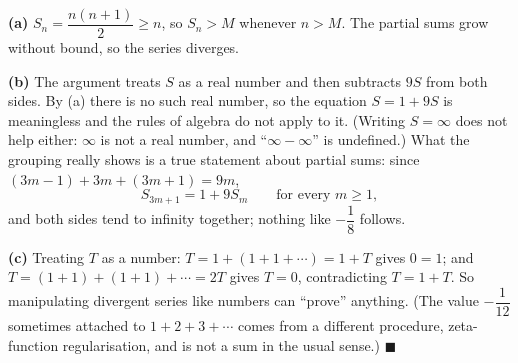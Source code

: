 \textbf{(a)} $S_n=\dfrac{n(n+1)}2\ge n$, so $S_n>M$ whenever $n>M$. The partial sums grow without bound, so the series diverges.

\textbf{(b)} The argument treats $S$ as a real number and then subtracts $9S$ from both sides. By (a) there is no such real number, so the equation $S=1+9S$ is meaningless and the rules of algebra do not apply to it. (Writing $S=\infty$ does not help either: $\infty$ is not a real number, and ``$\infty-\infty$'' is undefined.) What the grouping really shows is a true statement about partial sums: since $(3m-1)+3m+(3m+1)=9m$,
\[S_{3m+1}=1+9S_m\qquad\text{for every }m\ge1,\]
and both sides tend to infinity together; nothing like $-\dfrac18$ follows.

\textbf{(c)} Treating $T$ as a number: $T=1+(1+1+\cdots)=1+T$ gives $0=1$; and $T=(1+1)+(1+1)+\cdots=2T$ gives $T=0$, contradicting $T=1+T$. So manipulating divergent series like numbers can ``prove'' anything. (The value $-\dfrac1{12}$ sometimes attached to $1+2+3+\cdots$ comes from a different procedure, zeta-function regularisation, and is not a sum in the usual sense.) $\blacksquare$
